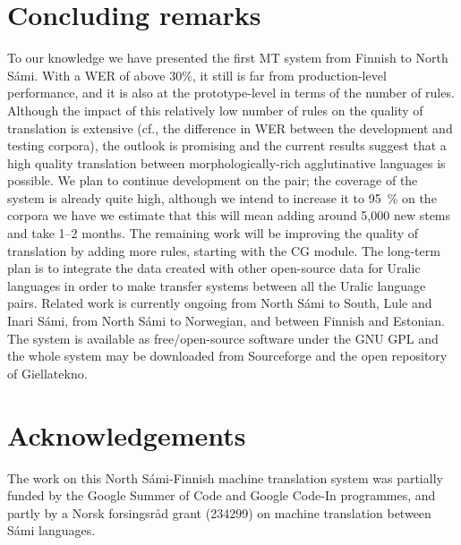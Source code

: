 \documentclass[free]{flammie}
\begin{document}
\section{Concluding remarks}
\label{sec:conclusions}

To our knowledge we have presented the first MT system from Finnish to North Sámi.
With a WER of above 30\%, it still is far from production-level performance, and it is also at the prototype-level in terms of the number of rules.
Although the impact of this relatively low number of rules on the quality of translation is extensive (cf., the difference in WER between the development and testing corpora), the outlook is promising and the current results suggest that a high quality translation between morphologically-rich agglutinative languages is possible.
We plan to continue development on the pair; the coverage of the system is already quite high, although we intend to increase it to 95~\% on the corpora we have
we estimate that this will mean adding around 5,000 new stems and take 1–2 months.
The remaining work will be improving the quality of translation by adding more rules, starting with the CG module.
The long-term plan is to integrate the data created with other open-source data for Uralic languages in order to make transfer systems between all the Uralic language pairs.
Related work is currently ongoing from North Sámi to South, Lule and Inari Sámi, from North  Sámi to Norwegian, and between Finnish and Estonian.
The system is available as free/open-source software under the GNU GPL and the whole system may be downloaded from Sourceforge and the open repository of Giellatekno.


\section*{Acknowledgements}
\label{sec:acknowlegdements}
The work on this North Sámi-Finnish machine translation system was partially funded by the Google Summer of Code and Google Code-In programmes, and partly by a Norsk forsingsråd grant (234299) on machine translation between Sámi languages.


\end{document}

